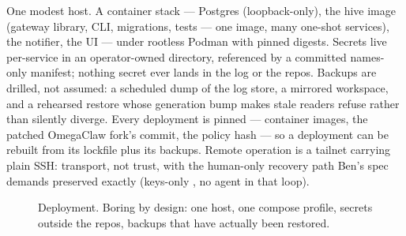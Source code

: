 One modest host. A container stack --- Postgres (loopback-only), the hive image (gateway library, CLI, migrations, tests --- one image, many one-shot services), the notifier, the UI --- under rootless Podman with pinned digests. Secrets live per-service in an operator-owned directory, referenced by a committed names-only manifest; nothing secret ever lands in the log or the repos. Backups are drilled, not assumed: a scheduled dump of the log store, a mirrored workspace, and a rehearsed restore whose generation bump makes stale readers refuse rather than silently diverge. Every deployment is pinned --- container images, the patched OmegaClaw fork's commit, the policy hash --- so a deployment can be rebuilt from its lockfile plus its backups. Remote operation is a tailnet carrying plain SSH: transport, not trust, with the human-only recovery path Ben's spec demands preserved exactly (keys-only , no agent in that loop).

\begin{figure}[h]
\centering
{}
\caption{Deployment. Boring by design: one host, one compose profile, secrets outside the repos, backups that have actually been restored.}
\end{figure}

